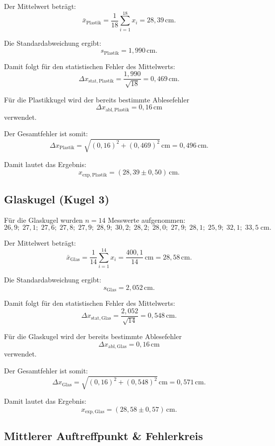\documentclass{article}
\begin{document}
Der Mittelwert beträgt:
\[
\bar{x}_{\mathrm{Plastik}}
=\frac{1}{18}\sum_{i=1}^{18}x_i
=28{,}39\,\mathrm{cm}.
\]

Die Standardabweichung ergibt:
\[
s_{\mathrm{Plastik}}=1{,}990\,\mathrm{cm}.
\]

Damit folgt für den statistischen Fehler des Mittelwerts:
\[
\Delta x_{\mathrm{stat,Plastik}}
=\frac{1{,}990}{\sqrt{18}}
=0{,}469\,\mathrm{cm}.
\]

Für die Plastikkugel wird der bereits bestimmte Ablesefehler
\[
\Delta x_{\mathrm{abl,Plastik}}=0{,}16\,\mathrm{cm}
\]
verwendet.

Der Gesamtfehler ist somit:
\[
\Delta x_{\mathrm{Plastik}}
=\sqrt{(0{,}16)^2+(0{,}469)^2}\,\mathrm{cm}
=0{,}496\,\mathrm{cm}.
\]

Damit lautet das Ergebnis:
\[
x_{\mathrm{exp,Plastik}}=(28{,}39\pm0{,}50)\,\mathrm{cm}.
\]

\subsection*{Glaskugel (Kugel 3)}
Für die Glaskugel wurden \(n=14\) Messwerte aufgenommen:
\[
26{,}9;\;27{,}1;\;27{,}6;\;27{,}8;\;27{,}9;\;28{,}9;\;30{,}2;\;28{,}2;\;28{,}0;\;27{,}9;\;28{,}1;\;25{,}9;\;32{,}1;\;33{,}5\;\mathrm{cm}.
\]

Der Mittelwert beträgt:
\[
\bar{x}_{\mathrm{Glas}}
=\frac{1}{14}\sum_{i=1}^{14}x_i
=\frac{400{,}1}{14}\,\mathrm{cm}
=28{,}58\,\mathrm{cm}.
\]

Die Standardabweichung ergibt:
\[
s_{\mathrm{Glas}}=2{,}052\,\mathrm{cm}.
\]

Damit folgt für den statistischen Fehler des Mittelwerts:
\[
\Delta x_{\mathrm{stat,Glas}}
=\frac{2{,}052}{\sqrt{14}}
=0{,}548\,\mathrm{cm}.
\]

Für die Glaskugel wird der bereits bestimmte Ablesefehler
\[
\Delta x_{\mathrm{abl,Glas}}=0{,}16\,\mathrm{cm}
\]
verwendet.

Der Gesamtfehler ist somit:
\[
\Delta x_{\mathrm{Glas}}
=\sqrt{(0{,}16)^2+(0{,}548)^2}\,\mathrm{cm}
=0{,}571\,\mathrm{cm}.
\]

Damit lautet das Ergebnis:
\[
x_{\mathrm{exp,Glas}}=(28{,}58\pm0{,}57)\,\mathrm{cm}.
\]












\subsection{Mittlerer Auftreffpunkt \& Fehlerkreis}
\end{document}
